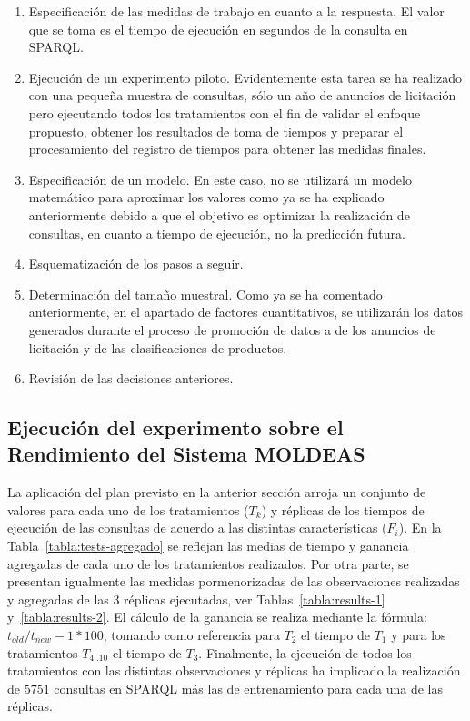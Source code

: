 \begin{enumerate}
 \item Especificación de las medidas de trabajo en cuanto a la respuesta. El valor que se toma es el tiempo de ejecución 
en segundos de la consulta en SPARQL. 
 \item Ejecución de un experimento piloto. Evidentemente esta tarea se ha realizado con una pequeña muestra de consultas, sólo un año de anuncios 
de licitación pero ejecutando todos los tratamientos con el fin de validar el enfoque propuesto, obtener los resultados de toma de tiempos y preparar 
el procesamiento del registro de tiempos para obtener las medidas finales.
 \item Especificación de un modelo. En este caso, no se utilizará un modelo matemático para aproximar los valores 
como ya se ha explicado anteriormente debido a que el objetivo es optimizar la realización de consultas, en cuanto a 
tiempo de ejecución, no la predicción futura.
 \item Esquematización de los pasos a seguir.
 \item Determinación del tamaño muestral. Como ya se ha comentado anteriormente, en el apartado de factores cuantitativos, se utilizarán los datos generados durante el proceso de promoción 
de datos a \linkeddata de los anuncios de licitación y de las clasificaciones de productos.
 \item Revisión de las decisiones anteriores.
\end{enumerate}

\subsection{Ejecución del experimento sobre el Rendimiento del Sistema MOLDEAS}
La aplicación del plan previsto en la anterior sección arroja un conjunto de valores para cada uno de los tratamientos ($T_k$) y réplicas de los tiempos 
de ejecución de las consultas de acuerdo a las distintas características ($F_i$). En la Tabla~\ref{tabla:tests-agregado} se reflejan 
las medias de tiempo y ganancia agregadas de cada uno de los tratamientos realizados. Por otra parte, se presentan igualmente 
las medidas pormenorizadas de las observaciones realizadas y agregadas de las 3 réplicas ejecutadas, ver Tablas~\ref{tabla:results-1} y~\ref{tabla:results-2}. 
El cálculo de la ganancia se realiza mediante la fórmula: $t_{old}/t_{new}-1*100$, tomando como referencia para $T_2$ el tiempo de $T_1$ y para 
los tratamientos $T_{4..10}$ el tiempo de $T_3$. Finalmente, la ejecución de todos los tratamientos con las distintas observaciones y 
réplicas ha implicado la realización de $5751$ consultas en SPARQL más las de entrenamiento para cada una de las réplicas. 

